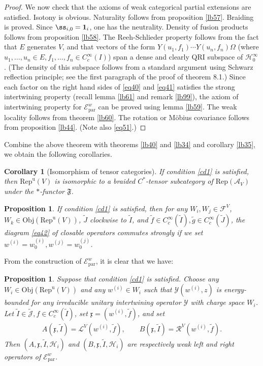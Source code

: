 \documentclass[11pt,b5paper,notitlepage]{article}
\theoremstyle{definition}
\theoremstyle{plain}
\newtheorem{pp}[df]{Proposition}
\newtheorem{co}[df]{Corollary}
\newcommand{\fk}{\mathfrak}
\newcommand{\mc}{\mathcal}
\newcommand{\wtd}{\widetilde}
\newcommand{\id}{\mathbf{1}}
\newcommand{\Rep}{\mathrm{Rep}}
\newcommand{\loc}{\mathrm{par}}
\newcommand{\scr}{\mathscr}
\newcommand{\Jtd}{\widetilde{\mathcal J}}
\newcommand{\RepuV}{\mathrm{Rep}^{\mathrm u}(V)}
\newcommand{\Obj}{\mathrm{Obj}}
\numberwithin{equation}{subsection}
\begin{document}
\begin{proof}
We now check that the axioms of  weak categorical partial extensions are satisfied. Isotony is obvious. Naturality follows from proposition \ref{lb57}. Braiding is proved. Since $\ss_{i,0}=\id_i$, one has the neutrality. Density of fusion products follows from proposition \ref{lb58}. The Reeh-Schlieder property follows from the fact that $E$ generates $V$, and that vectors of the form $Y(u_1,f_1)\cdots Y(u_n,f_n)\Omega$ (where $u_1,\dots,u_n\in E,f_1,\dots,f_n\in C_c^\infty(I)$) span a dense and clearly QRI subspace of $\mc H_0^\infty$. (The density of this subspace follows from a standard argument using Schwarz reflection principle; see the first paragraph of the proof of \cite{CKLW18} theorem 8.1.) Since each factor on the right hand sides of \eqref{eq40} and \eqref{eq41} satisfies the strong intertwining property (recall lemma \ref{lb61} and remark \ref{lb99}), the axiom of intertwining property for $\scr E^w_\loc$ can be proved using lemma \ref{lb59}. The weak locality follows from theorem \ref{lb60}. The rotation or M\"obius covariance follows from proposition \ref{lb44}.
(Note also \eqref{eq51}.)  %
\end{proof}


Combine the above theorem with theorems \ref{lb40} and \ref{lb34} and corollary \ref{lb35}, we obtain the following corollaries.

\begin{co}[Isomorphism of tensor categories]\label{lb71}
If condition \ref{cd1} is satisfied, then $\RepuV$ is isomorphic to a braided $C^*$-tensor subcategory of $\Rep(\mc A_V)$ under the $*$-functor $\fk F$.
\end{co}

\begin{pp}\label{lb78}
If condition \ref{cd1} is satisfied, then for any $W_i,W_j\in\mc F^V$, $W_k\in\Obj(\RepuV)$, $\wtd J$ clockwise to $\wtd I$, and $\wtd f\in C_c^\infty(\wtd I),\wtd g\in C_c^\infty(\wtd J)$, the diagram \eqref{eq42} of closable operators commutes strongly if we set $w^{(i)}=w^{(i)}_0,w^{(j)}=w^{(j)}_0$.
\end{pp}

From the construction of $\scr E^w_\loc$, it is clear that we have:

\begin{pp}\label{lb64}
Suppose that condition \ref{cd1} is satisfied. Choose any $W_i\in\Obj(\RepuV)$ and any $w^{(i)}\in W_i$ such that $\mc Y(w^{(i)},z)$ is energy-bounded for any irreducible unitary intertwining operator $\mc Y$ with charge space $W_i$. Let $\wtd I\in\Jtd,f\in C_c^\infty(\wtd I)$,  set $\fk x=(w^{(i)},\wtd f)$, and set
\begin{align}
A(\fk x,\wtd I)=\mc L^V(w^{(i)},\wtd f),\qquad B(\fk x,\wtd I)=\mc R^V(w^{(i)},\wtd f).
\end{align}
Then $(A,\fk x,\wtd I,\mc H_i)$ and $(B,\fk x,\wtd I,\mc H_i)$ are respectively weak left and right operators of $\scr E^w_\loc$.
\end{pp}
\end{document}
